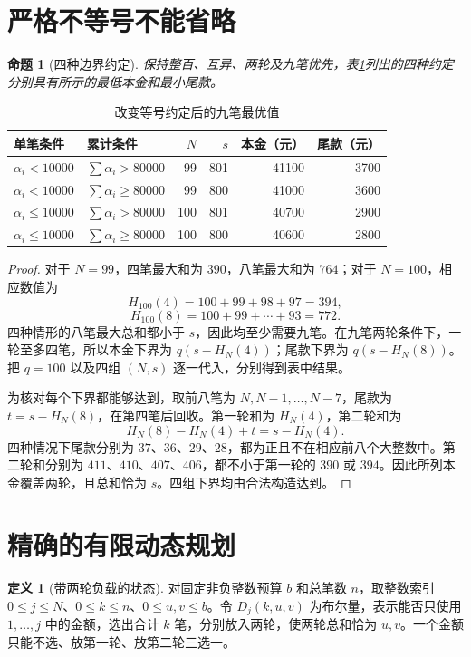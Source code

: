 \documentclass[UTF8,a4paper]{ctexbook}
\newtheorem{proposition}[theorem]{命题}
\theoremstyle{definition}
\newtheorem{definition}[theorem]{定义}
\numberwithin{equation}{chapter}
\newcommand{\1}{\mathbf{1}}
\begin{document}
\section{严格不等号不能省略}
\begin{proposition}[四种边界约定]\label{gen:boundaries}
保持整百、互异、两轮及九笔优先，表\ref{gen:boundary-table}列出的四种约定分别具有所示的最低本金和最小尾款。
\end{proposition}
\begin{table}[htbp]
\centering
\caption{改变等号约定后的九笔最优值}\label{gen:boundary-table}
\begin{tabular}{@{}llrrrr@{}}
\toprule
单笔条件 & 累计条件 & $N$ & $s$ & 本金（元） & 尾款（元）\\
\midrule
$\alpha_i<10000$ & $\sum\alpha_i>80000$ & 99 & 801 & 41100 & 3700\\
$\alpha_i<10000$ & $\sum\alpha_i\ge80000$ & 99 & 800 & 41000 & 3600\\
$\alpha_i\le10000$ & $\sum\alpha_i>80000$ & 100 & 801 & 40700 & 2900\\
$\alpha_i\le10000$ & $\sum\alpha_i\ge80000$ & 100 & 800 & 40600 & 2800\\
\bottomrule
\end{tabular}
\end{table}
\begin{proof}
对于 $N=99$，四笔最大和为 $390$，八笔最大和为 $764$；对于 $N=100$，相应数值为
\[
H_{100}(4)=100+99+98+97=394,
\]
\[
H_{100}(8)=100+99+\cdots+93=772.
\]
四种情形的八笔最大总和都小于 $s$，因此均至少需要九笔。在九笔两轮条件下，一轮至多四笔，所以本金下界为 $q(s-H_N(4))$；尾款下界为 $q(s-H_N(8))$。把 $q=100$ 以及四组 $(N,s)$ 逐一代入，分别得到表中结果。

为核对每个下界都能够达到，取前八笔为 $N,N-1,\ldots,N-7$，尾款为 $t=s-H_N(8)$，在第四笔后回收。第一轮和为 $H_N(4)$，第二轮和为
\[
H_N(8)-H_N(4)+t=s-H_N(4).
\]
四种情况下尾款分别为 $37$、$36$、$29$、$28$，都为正且不在相应前八个大整数中。第二轮和分别为 $411$、$410$、$407$、$406$，都不小于第一轮的 $390$ 或 $394$。因此所列本金覆盖两轮，且总和恰为 $s$。四组下界均由合法构造达到。
\end{proof}

\section{精确的有限动态规划}
\begin{definition}[带两轮负载的状态]\label{gen:dp-state}
对固定非负整数预算 $b$ 和总笔数 $n$，取整数索引 $0\le j\le N$、$0\le k\le n$、$0\le u,v\le b$。令 $D_j(k,u,v)$ 为布尔量，表示能否只使用 $1,\ldots,j$ 中的金额，选出合计 $k$ 笔，分别放入两轮，使两轮总和恰为 $u,v$。一个金额只能不选、放第一轮、放第二轮三选一。
\end{definition}
\end{document}
